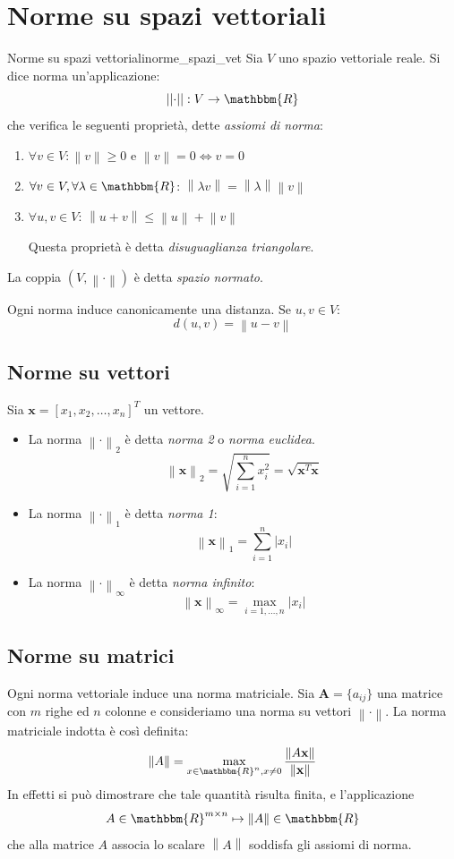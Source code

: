 \documentclass[12pt]{report}
\newcounter{definition}
\newcommand{\nmu}{}
\begin{document}
\section{Norme su spazi vettoriali}
\begin{definition}{\nmu Norme su spazi vettoriali}{norme_spazi_vet}
	Sia $V$ uno spazio vettoriale reale. Si dice norma un'applicazione:
	\[
	\left|\left|\cdot\right|\right|: V \to \mathbbm{R}
	\]
	che verifica le seguenti proprietà, dette \textit{assiomi di norma}:
	\begin{enumerate}
		\item $\forall v \in V: \left\|v\right\| \geq 0$ e $\left\| v\right\| = 0 \iff v = 0$
		\item $\forall v \in V, \forall \lambda \in \mathbbm{R}$: $\left\| \lambda v\right\| =  \left\| \lambda\right\|\left\| v\right\|$
		\item $\forall u, v \in V$: $ \left\| u + v\right\| \leq  \left\| u\right\| + \left\| v\right\| $

		Questa proprietà è detta \textit{disuguaglianza triangolare}.
	\end{enumerate}
	La coppia $(V,  \left\| \cdot\right\|)$ è detta \textit{spazio normato}.
\end{definition}
Ogni norma induce canonicamente una distanza. Se $u, v \in V$:
\[
d(u, v) = \left\| u-v\right\|
\]
\subsection{Norme su vettori}
Sia $\mathbf{x} = [x_1, x_2, \dots, x_n]^T$ un vettore.
\begin{itemize}
	\item La norma $ \left\| \cdot \right\|_2$ è detta \textit{norma 2} o \textit{norma euclidea}.
	\[
 \left\| \mathbf{x}\right\|_2 = \sqrt{\displaystyle\sum_{i=1}^{n}x_i^2} = \sqrt{\mathbf{x}^T\mathbf{x}}
	\]
	\item La norma $\left\| \cdot \right\|_1$ è detta \textit{norma 1}:
	\[
	\left\|\mathbf{x}\right\|_1 = \displaystyle\sum_{i=1}^{n}\left| x_i\right|
	\]
	\item La norma $\left\| \cdot \right\|_\infty$ è detta \textit{norma infinito}:
	\[
	\left\|\mathbf{x}\right\|_\infty = \max_{i = 1,\dots, n}\left| x_i\right|
	\]
\end{itemize}
\subsection{Norme su matrici}
Ogni norma vettoriale induce una norma matriciale. Sia $\mathbf{A} = \{a_{ij}\}$ una matrice con $m$ righe ed $n$ colonne e consideriamo una norma su vettori $\left\|\cdot\right\|$. La norma matriciale indotta è così definita:
\[
\left\|A\right\| = \max_{x\in\mathbbm{R}^n, x\neq0} \dfrac{\left\|A\mathbf{x}\right\|}{\left\|\mathbf{x}\right\|}
\]
In effetti si può dimostrare che tale quantità risulta finita, e l'applicazione
\[
A \in \mathbbm{R}^{m\times n} \mapsto \left\|A\right\| \in \mathbbm{R}
\]
che alla matrice $A$ associa lo scalare $\left\|A\right\|$ soddisfa gli assiomi di norma.
\end{document}

